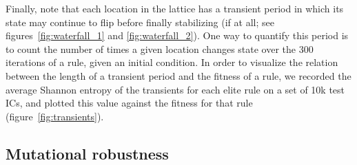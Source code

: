 
Finally, note that each location in the lattice has a transient period in which its state may continue to flip before finally stabilizing (if at all; see figures~\ref{fig:waterfall_1} and \ref{fig:waterfall_2}). One way to quantify this period is to count the number of times a given location changes state 
over the 300 iterations of a rule, given an initial condition. In order to visualize the relation between the length of a transient period and the fitness of a rule, 
we recorded the average Shannon entropy of the transients for each elite rule on a set of 10k test ICs, and plotted this value against the fitness 
for that rule (figure~\ref{fig:transients}).

\subsection{Mutational robustness} \label{sec:2_2}

